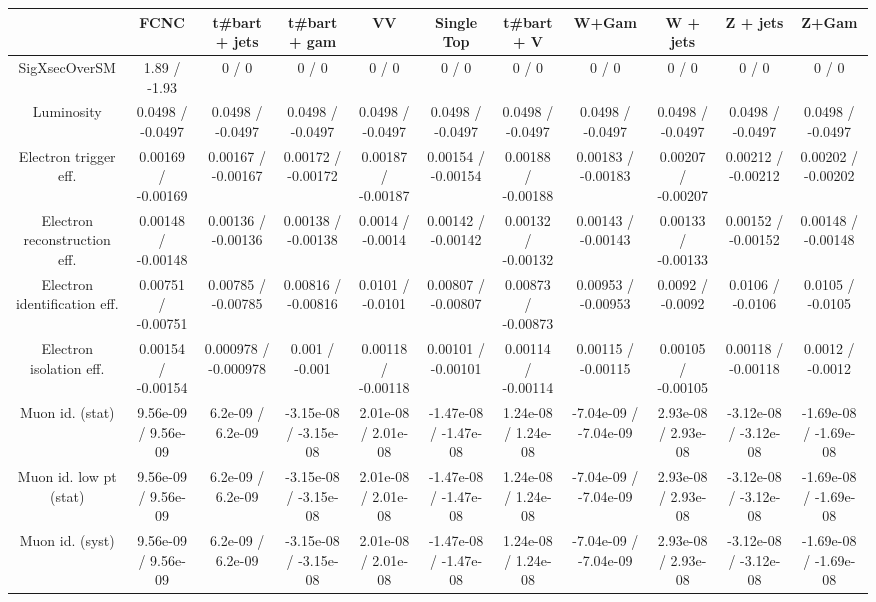 \begin{table}[htbp]
\begin{center}
\footnotesize
\begin{tabular}{|c|c|c|c|c|c|c|c|c|c|c|}
\hline 
      & FCNC      & t#bar{t} + jets      & t#bar{t} +  gam      & VV      & Single Top      & t#bar{t} + V      & W+Gam      & W + jets      & Z + jets      & Z+Gam \\ 
\hline 
 SigXsecOverSM & 1.89 / -1.93 & 0 / 0 & 0 / 0 & 0 / 0 & 0 / 0 & 0 / 0 & 0 / 0 & 0 / 0 & 0 / 0 & 0 / 0 \\ 
  Luminosity & 0.0498 / -0.0497 & 0.0498 / -0.0497 & 0.0498 / -0.0497 & 0.0498 / -0.0497 & 0.0498 / -0.0497 & 0.0498 / -0.0497 & 0.0498 / -0.0497 & 0.0498 / -0.0497 & 0.0498 / -0.0497 & 0.0498 / -0.0497 \\ 
  Electron trigger eff. & 0.00169 / -0.00169 & 0.00167 / -0.00167 & 0.00172 / -0.00172 & 0.00187 / -0.00187 & 0.00154 / -0.00154 & 0.00188 / -0.00188 & 0.00183 / -0.00183 & 0.00207 / -0.00207 & 0.00212 / -0.00212 & 0.00202 / -0.00202 \\ 
  Electron reconstruction eff. & 0.00148 / -0.00148 & 0.00136 / -0.00136 & 0.00138 / -0.00138 & 0.0014 / -0.0014 & 0.00142 / -0.00142 & 0.00132 / -0.00132 & 0.00143 / -0.00143 & 0.00133 / -0.00133 & 0.00152 / -0.00152 & 0.00148 / -0.00148 \\ 
  Electron identification eff. & 0.00751 / -0.00751 & 0.00785 / -0.00785 & 0.00816 / -0.00816 & 0.0101 / -0.0101 & 0.00807 / -0.00807 & 0.00873 / -0.00873 & 0.00953 / -0.00953 & 0.0092 / -0.0092 & 0.0106 / -0.0106 & 0.0105 / -0.0105 \\ 
  Electron isolation eff. & 0.00154 / -0.00154 & 0.000978 / -0.000978 & 0.001 / -0.001 & 0.00118 / -0.00118 & 0.00101 / -0.00101 & 0.00114 / -0.00114 & 0.00115 / -0.00115 & 0.00105 / -0.00105 & 0.00118 / -0.00118 & 0.0012 / -0.0012 \\ 
  Muon id. (stat) & 9.56e-09 / 9.56e-09 & 6.2e-09 / 6.2e-09 & -3.15e-08 / -3.15e-08 & 2.01e-08 / 2.01e-08 & -1.47e-08 / -1.47e-08 & 1.24e-08 / 1.24e-08 & -7.04e-09 / -7.04e-09 & 2.93e-08 / 2.93e-08 & -3.12e-08 / -3.12e-08 & -1.69e-08 / -1.69e-08 \\ 
  Muon id. low pt (stat) & 9.56e-09 / 9.56e-09 & 6.2e-09 / 6.2e-09 & -3.15e-08 / -3.15e-08 & 2.01e-08 / 2.01e-08 & -1.47e-08 / -1.47e-08 & 1.24e-08 / 1.24e-08 & -7.04e-09 / -7.04e-09 & 2.93e-08 / 2.93e-08 & -3.12e-08 / -3.12e-08 & -1.69e-08 / -1.69e-08 \\ 
  Muon id. (syst) & 9.56e-09 / 9.56e-09 & 6.2e-09 / 6.2e-09 & -3.15e-08 / -3.15e-08 & 2.01e-08 / 2.01e-08 & -1.47e-08 / -1.47e-08 & 1.24e-08 / 1.24e-08 & -7.04e-09 / -7.04e-09 & 2.93e-08 / 2.93e-08 & -3.12e-08 / -3.12e-08 & -1.69e-08 / -1.69e-08 \\ 

\end{tabular}
\end{center}
\end{table}
